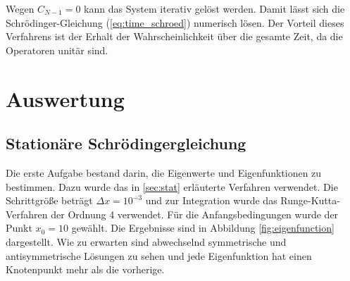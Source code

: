 \documentclass[a4paper, 11pt]{scrartcl}
\begin{document}
Wegen $C_{N-1} = 0$ kann das System iterativ gelöst werden. Damit lässt sich die Schrödinger-Gleichung (\ref{eq:time_schroed}) numerisch lösen. Der Vorteil dieses Verfahrens ist der Erhalt der Wahrscheinlichkeit über die gesamte Zeit, da die Operatoren unitär sind.

\section{Auswertung}
\subsection{Stationäre Schrödingergleichung}
Die erste Aufgabe bestand darin, die Eigenwerte und Eigenfunktionen zu bestimmen. Dazu wurde das in \ref{sec:stat} erläuterte Verfahren verwendet. Die Schrittgröße beträgt $\Delta x = 10^{-3}$ und zur Integration wurde das Runge-Kutta-Verfahren der Ordnung 4 verwendet. Für die Anfangsbedingungen wurde der Punkt $x_0 = 10$ gewählt. Die Ergebnisse sind in Abbildung \ref{fig:eigenfunction} dargestellt. Wie zu erwarten sind abwechselnd symmetrische und antisymmetrische Lösungen zu sehen und jede Eigenfunktion hat einen Knotenpunkt mehr als die vorherige.
%
\end{document}
